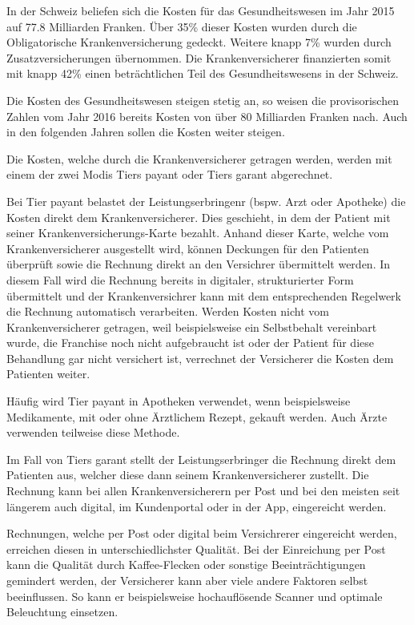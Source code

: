 \documentclass[12pt]{extarticle}
\begin{document}
In der Schweiz beliefen sich die Kosten für das Gesundheitswesen im Jahr 2015 auf 77.8 Milliarden Franken. Über 35\% dieser Kosten wurden durch die Obligatorische Krankenversicherung gedeckt. Weitere knapp 7\% wurden durch Zusatzversicherungen übernommen. Die Krankenversicherer finanzierten somit mit knapp 42\% einen beträchtlichen Teil des Gesundheitswesens in der Schweiz.

Die Kosten des Gesundheitswesen steigen stetig an, so weisen die provisorischen Zahlen vom Jahr 2016 bereits Kosten von über 80 Milliarden Franken nach. Auch in den folgenden Jahren sollen die Kosten weiter steigen.

Die Kosten, welche durch die Krankenversicherer getragen werden, werden mit einem der zwei Modis Tiers payant oder Tiers garant abgerechnet. 

Bei Tier payant belastet der Leistungserbringenr (bspw. Arzt oder Apotheke) die Kosten direkt dem Krankenversicherer. Dies geschieht, in dem der Patient mit seiner Kranken\-versicherungs-Karte bezahlt. Anhand dieser Karte, welche vom Krankenversicherer ausgestellt wird, können Deckungen für den Patienten überprüft sowie die Rechnung direkt an den Versichrer übermittelt werden. In diesem Fall wird die Rechnung bereits in digitaler, strukturierter Form übermittelt und der Krankenversichrer kann mit dem entsprechenden Regelwerk die Rechnung automatisch verarbeiten. Werden Kosten nicht vom Krankenversicherer getragen, weil beispielsweise ein Selbstbehalt vereinbart wurde, die Franchise noch nicht aufgebraucht ist oder der Patient für diese Behandlung gar nicht versichert ist, verrechnet der Versicherer die Kosten dem Patienten weiter.

Häufig wird Tier payant in Apotheken verwendet, wenn beispielsweise Medikamente, mit oder ohne Ärztlichem Rezept, gekauft werden. Auch Ärzte verwenden teilweise diese Methode.

Im Fall von Tiers garant stellt der Leistungserbringer die Rechnung direkt dem Patienten aus, welcher diese dann seinem Krankenversicherer zustellt. Die Rechnung kann bei allen Krankenversicherern per Post und bei den meisten seit längerem auch digital, im Kundenportal oder in der App, eingereicht werden.

Rechnungen, welche per Post oder digital beim Versichrerer eingereicht werden, erreichen diesen in unterschiedlichster Qualität. Bei der Einreichung per Post kann die Qualität durch Kaffee-Flecken oder sonstige Beeinträchtigungen gemindert werden, der Versicherer kann aber viele andere Faktoren selbst beeinflussen. So kann er beispielsweise hochauflösende Scanner und optimale Beleuchtung einsetzen.
\end{document}
